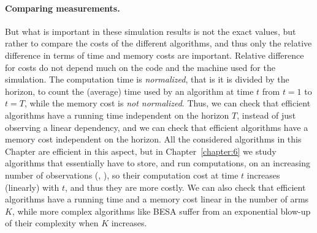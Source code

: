 \paragraph{Comparing measurements.}
But what is important in these simulation results is not the exact values, but rather to compare the costs of the different algorithms, and thus only the relative difference in terms of time and memory costs are important.
Relative difference for costs do not depend much on the code and the machine used for the simulation.
%
The computation time is \emph{normalized}, that is it is divided by the horizon, to count the (average) time used by an algorithm at time $t$ from $t=1$ to $t=T$, while the memory cost is \emph{not normalized}.
%
Thus, we can check that efficient algorithms have a running time independent on the horizon $T$, instead of just observing a linear dependency, and we can check that efficient algorithms have a memory cost independent on the horizon.
All the considered algorithms in this Chapter are efficient in this aspect, but in Chapter~\ref{chapter:6} we study algorithms that essentially have to store, and run computations, on an increasing number of observations (\eg, \CUSUMUCB), so their computation cost at time $t$ increases (linearly) with $t$, and thus they are more costly.
%
We can also check that efficient algorithms have a running time and a memory cost linear in the number of arms $K$, while more complex algorithms like BESA suffer from an exponential blow-up of their complexity when $K$ increases.


